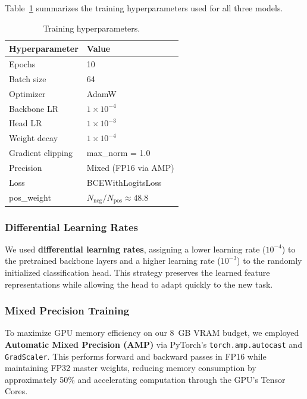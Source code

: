 \documentclass[11pt, a4paper, twocolumn]{article}
\begin{document}
Table~\ref{tab:hyperparams} summarizes the training hyperparameters
used for all three models.

\begin{table}[H]
    \centering
    \caption{Training hyperparameters.}
    \label{tab:hyperparams}
    \begin{tabular}{@{}ll@{}}
        \toprule
        \textbf{Hyperparameter} & \textbf{Value} \\
        \midrule
        Epochs          & 10 \\
        Batch size      & 64 \\
        Optimizer       & AdamW \\
        Backbone LR     & $1 \times 10^{-4}$ \\
        Head LR         & $1 \times 10^{-3}$ \\
        Weight decay    & $1 \times 10^{-4}$ \\
        Gradient clipping & max\_norm = 1.0 \\
        Precision       & Mixed (FP16 via AMP) \\
        Loss            & BCEWithLogitsLoss \\
        pos\_weight     & $N_{\text{neg}} / N_{\text{pos}} \approx 48.8$ \\
        \bottomrule
    \end{tabular}
\end{table}

\subsubsection{Differential Learning Rates}

We used \textbf{differential learning rates}, assigning a lower
learning rate ($10^{-4}$) to the pretrained backbone layers and a
higher learning rate ($10^{-3}$) to the randomly initialized
classification head. This strategy preserves the learned feature
representations while allowing the head to adapt quickly to the
new task.

\subsubsection{Mixed Precision Training}

To maximize GPU memory efficiency on our 8~GB VRAM budget, we employed
\textbf{Automatic Mixed Precision (AMP)} via PyTorch's
\texttt{torch.amp.autocast} and \texttt{GradScaler}. This performs
forward and backward passes in FP16 while maintaining FP32 master
weights, reducing memory consumption by approximately 50\% and
accelerating computation through the GPU's Tensor Cores.
\end{document}

